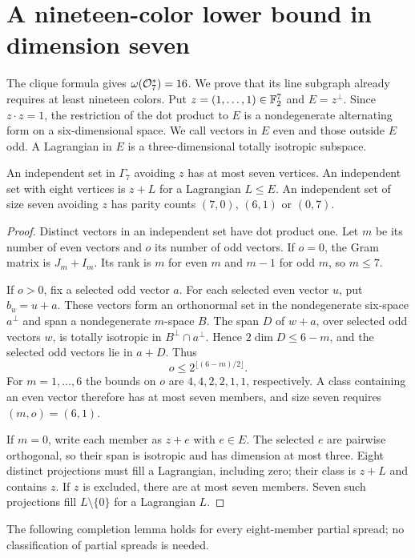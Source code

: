 \section{A nineteen-color lower bound in dimension seven}
\label{sec:seven}

The clique formula gives $\omega(\mathcal O_7^*)=16$. We prove that its
line subgraph already requires at least nineteen colors. Put
$z=(1,\ldots,1)\in\mathbb F_2^7$ and $E=z^\perp$. Since $z\cdot z=1$,
the restriction of the dot product to $E$ is a nondegenerate
alternating form on a six-dimensional space. We call vectors
in $E$ even and those outside $E$ odd. A Lagrangian in $E$ is
a three-dimensional totally isotropic subspace.

\begin{lemma}\label{lem:seven-capacity}
An independent set in $\Gamma_7$ avoiding $z$ has at most seven
vertices. An independent set with eight vertices is $z+L$ for
a Lagrangian $L\leq E$. An independent set of size seven avoiding
$z$ has parity counts $(7,0)$, $(6,1)$ or $(0,7)$.
\end{lemma}
\begin{proof}
Distinct vectors in an independent set have dot product one.
Let $m$ be its number of even vectors and $o$ its number of odd
vectors. If $o=0$, the Gram matrix is $J_m+I_m$. Its rank is $m$
for even $m$ and $m-1$ for odd $m$, so $m\leq7$.

If $o>0$, fix a selected odd vector $a$. For each selected even
vector $u$, put $b_u=u+a$. These vectors form an orthonormal set
in the nondegenerate six-space $a^\perp$ and span a nondegenerate
$m$-space $B$. The span $D$ of $w+a$, over selected odd vectors
$w$, is totally isotropic in $B^\perp\cap a^\perp$. Hence
$2\dim D\leq6-m$, and the selected odd vectors lie in $a+D$.
Thus
\[
o\leq2^{\lfloor(6-m)/2\rfloor}.
\]
For $m=1,\ldots,6$ the bounds on $o$ are $4,4,2,2,1,1$,
respectively. A class containing an even vector therefore has
at most seven members, and size seven requires $(m,o)=(6,1)$.

If $m=0$, write each member as $z+e$ with $e\in E$. The selected
$e$ are pairwise orthogonal, so their span is isotropic and has
dimension at most three. Eight distinct projections must fill a
Lagrangian, including zero; their class is $z+L$ and contains $z$.
If $z$ is excluded, there are at most seven members. Seven such
projections fill $L\setminus\{0\}$ for a Lagrangian $L$.
\end{proof}

The following completion lemma holds for every eight-member
partial spread; no classification of partial spreads is needed.

